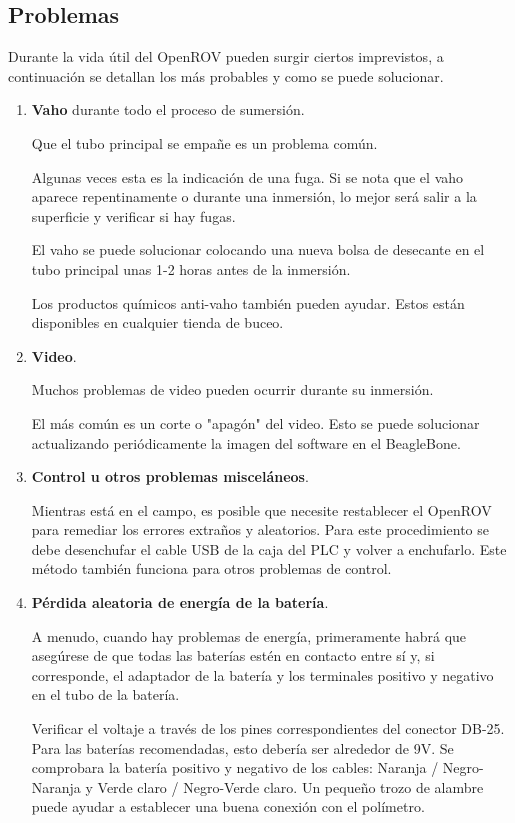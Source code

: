 \subsection{Problemas}
\label{subsec:problemas}

Durante la vida útil del OpenROV pueden surgir ciertos imprevistos, a continuación se detallan los más probables y como se puede solucionar.
\begin{enumerate}
\item \textbf{Vaho} durante todo el proceso de sumersión.

Que el tubo principal se empañe es un problema común.

Algunas veces esta es la indicación de una fuga. Si se nota que el vaho aparece repentinamente o durante una inmersión, lo mejor será salir a la superficie y verificar si hay fugas.

El vaho se puede solucionar colocando una nueva bolsa de desecante en el tubo principal unas 1-2 horas antes de la inmersión.

Los productos químicos anti-vaho también pueden ayudar. Estos están disponibles en cualquier tienda de buceo.

\item \textbf{Video}.

Muchos problemas de video pueden ocurrir durante su inmersión.

El más común es un corte o "apagón" del video. Esto se puede solucionar actualizando periódicamente la imagen del software en el BeagleBone.

\item \textbf{Control u otros problemas misceláneos}.

Mientras está en el campo, es posible que necesite restablecer el OpenROV para remediar los errores extraños y aleatorios. Para este procedimiento se debe desenchufar el cable USB de la caja del PLC y volver a enchufarlo. Este método también funciona para otros problemas de control.

\item \textbf{Pérdida aleatoria de energía de la batería}.

A menudo, cuando hay problemas de energía, primeramente habrá que asegúrese de que todas las baterías estén en contacto entre sí y, si corresponde, el adaptador de la batería y los terminales positivo y negativo en el tubo de la batería.

Verificar el voltaje a través de los pines correspondientes del conector DB-25. Para las baterías recomendadas, esto debería ser alrededor de 9V. Se comprobara la batería positivo y negativo de los cables: Naranja / Negro-Naranja y Verde claro / Negro-Verde claro. Un pequeño trozo de alambre puede ayudar a establecer una buena conexión con el polímetro.


\end{enumerate}
